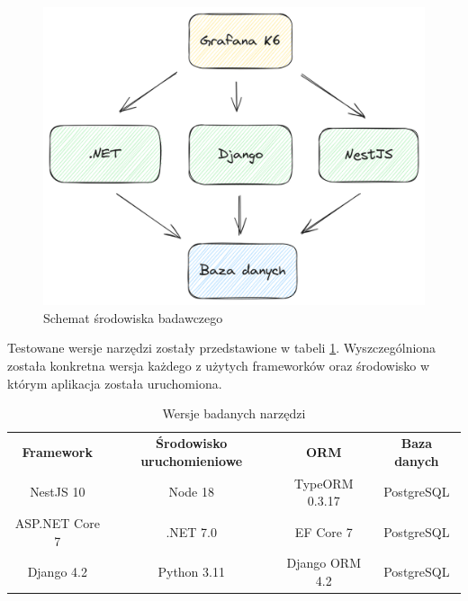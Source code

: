 \begin{figure}[!hb]
	\centering \includegraphics[width=1\linewidth]{rysunki/framework_benchmark_schema.png}
	\caption{Schemat środowiska badawczego}
	\label{rys:docker_schema}
\end{figure}



Testowane wersje narzędzi zostały przedstawione w tabeli \ref{table:version}.
Wyszczególniona została konkretna wersja każdego z użytych frameworków oraz środowisko w którym aplikacja została uruchomiona.

\begin{center}
	\begin{table}[h!]
	\begin{tabular}{ |c|c|c|c| } 
		\hline
		\textbf{Framework} & \textbf{Środowisko uruchomieniowe} & \textbf{ORM} & \textbf{Baza danych} \\ 
		NestJS 10 & Node 18 & TypeORM 0.3.17 & PostgreSQL \\
		ASP.NET Core 7 & .NET 7.0 & EF Core 7 & PostgreSQL \\ 
		Django 4.2 & Python 3.11 & Django ORM 4.2 & PostgreSQL \\
		\hline
	\end{tabular}
	\caption{Wersje badanych narzędzi}
	\label{table:version}
	\end{table}
\end{center}




